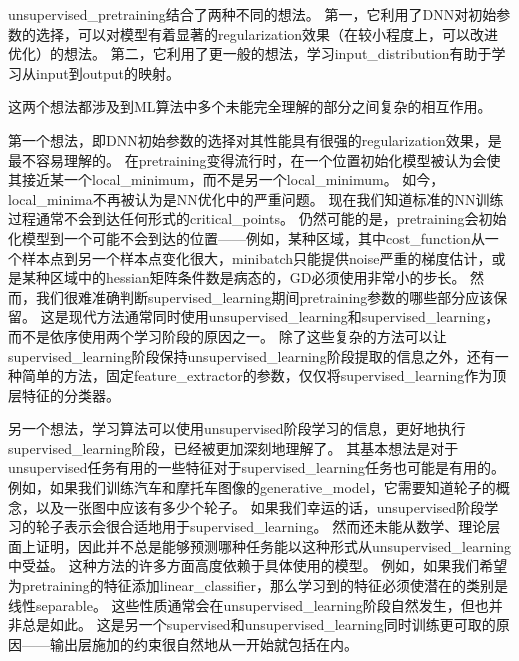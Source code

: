 
\gls{unsupervised_pretraining}结合了两种不同的想法。
第一，它利用了\gls{DNN}对初始参数的选择，可以对模型有着显著的\gls{regularization}效果（在较小程度上，可以改进优化）的想法。
第二，它利用了更一般的想法，学习\gls{input_distribution}有助于学习从\gls{input}到\gls{output}的映射。


这两个想法都涉及到\gls{ML}算法中多个未能完全理解的部分之间复杂的相互作用。

第一个想法，即\gls{DNN}初始参数的选择对其性能具有很强的\gls{regularization}效果，是最不容易理解的。
在\gls{pretraining}变得流行时，在一个位置初始化模型被认为会使其接近某一个\gls{local_minimum}，而不是另一个\gls{local_minimum}。%
如今，\gls{local_minima}不再被认为是\gls{NN}优化中的严重问题。
现在我们知道标准的\gls{NN}训练过程通常不会到达任何形式的\gls{critical_points}。
仍然可能的是，\gls{pretraining}会初始化模型到一个可能不会到达的位置——例如，某种区域，其中\gls{cost_function}从一个样本点到另一个样本点变化很大，\gls{minibatch}只能提供\gls{noise}严重的梯度估计，或是某种区域中的\gls{hessian}矩阵条件数是病态的，\gls{GD}必须使用非常小的步长。
然而，我们很难准确判断\gls{supervised_learning}期间\gls{pretraining}参数的哪些部分应该保留。
这是现代方法通常同时使用\gls{unsupervised_learning}和\gls{supervised_learning}，而不是依序使用两个学习阶段的原因之一。
除了这些复杂的方法可以让\gls{supervised_learning}阶段保持\gls{unsupervised_learning}阶段提取的信息之外，还有一种简单的方法，固定\gls{feature_extractor}的参数，仅仅将\gls{supervised_learning}作为顶层特征的分类器。


另一个想法，学习算法可以使用\gls{unsupervised}阶段学习的信息，更好地执行\gls{supervised_learning}阶段，已经被更加深刻地理解了。
其基本想法是对于\gls{unsupervised}任务有用的一些特征对于\gls{supervised_learning}任务也可能是有用的。
例如，如果我们训练汽车和摩托车图像的\gls{generative_model}，它需要知道轮子的概念，以及一张图中应该有多少个轮子。
如果我们幸运的话，\gls{unsupervised}阶段学习的轮子表示会很合适地用于\gls{supervised_learning}。
然而还未能从数学、理论层面上证明，因此并不总是能够预测哪种任务能以这种形式从\gls{unsupervised_learning}中受益。
这种方法的许多方面高度依赖于具体使用的模型。
例如，如果我们希望为\gls{pretraining}的特征添加\gls{linear_classifier}，那么学习到的特征必须使潜在的类别是线性\gls{separable}。
这些性质通常会在\gls{unsupervised_learning}阶段自然发生，但也并非总是如此。
这是另一个\gls{supervised}和\gls{unsupervised_learning}同时训练更可取的原因——输出层施加的约束很自然地从一开始就包括在内。

